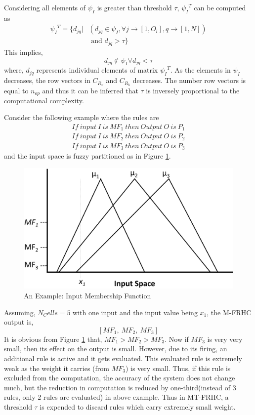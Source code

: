 Considering all elements of ${\psi _I} $ is greater than threshold $ \tau $, ${\psi _I}^T $ can be computed as 
\begin{align} \label{eq:MTFRHC}
{\psi _I}^T = \{ {d_{jq}}|&({d_{jq}} \in {\psi _I},\forall j \to [1,{O_l}],q \to [1,N]) \\ \nonumber
&\text{ and }{d_{jq}} > \tau \}
\end{align} 
This implies,
\[{d_{jq}} \notin {\psi _I}\forall {d_{jq}} < \tau \]
where, $ {d_{jq}} $ represents individual elements of matrix $ {\psi _I}^T $.
As the elements in $ {\psi _I} $ decreases, the row vectors in $ {C_{{R_v}}} $ and $ {C_{{R_k}}} $ decreases. The number row vectors is equal to $ n_{op}  $ and thus it can be inferred that $ \tau $ is inversely proportional to the computational complexity.

Consider the following example where the rules are 
\[\begin{array}{l}
If~input~I~is~M{F_1}~then~Output~O~is~{P_1}\\
If~input~I~is~M{F_2}~then~Output~O~is~{P_2}\\
If~input~I~is~M{F_3}~then~Output~O~is~{P_3}
\end{array}\]
and the input space is fuzzy partitioned as in Figure \ref{fig:MTFRHC_plot_2}.
\begin{figure}[h]
\centering
\includegraphics[width=0.7\linewidth]{Chapter2/chapter2/MTFRHC_plot_2}
\caption{An Example: Input Membership Function}
\label{fig:MTFRHC_plot_2}
\end{figure}

Assuming, $N_Cells=5$ with one input and the input value being $x_1$, the M-FRHC output is,
\[\left [M{F_1},~M{F_2},~M{F_3}\right ]\]
It is obvious from  Figure \ref{fig:MTFRHC_plot_2} that, $ M{F_1}>M{F_2}>M{F_3} $. Now if $M{F_3}$ is very very small, then its effect on the output is small. However, due to its firing, an additional rule is active and it gets evaluated. This evaluated rule is extremely weak as the weight it carries (from $M{F_3}$) is very small. Thus, if this rule is excluded from the computation, the accuracy of the system does not change much, but the reduction in computation is reduced by one-third(instead of 3 rules, only 2 rules are evaluated) in above example. Thus in MT-FRHC, a threshold $\tau $ is expended to discard rules which carry extremely small weight.


